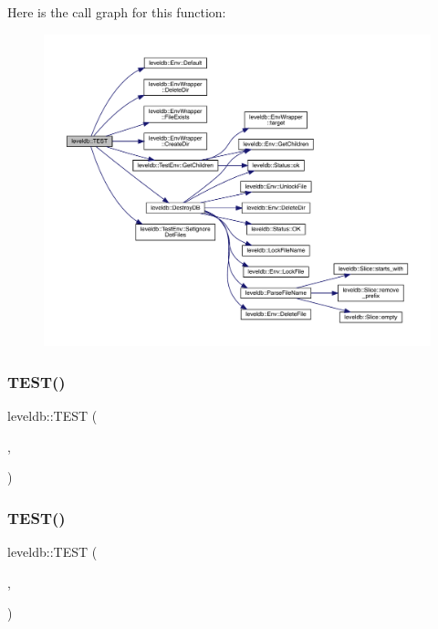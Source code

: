 Here is the call graph for this function\+:
\nopagebreak
\begin{figure}[H]
\begin{center}
\leavevmode
\includegraphics[width=350pt]{namespaceleveldb_a63ad7fa22ccda6c82e41ab295482b8ba_cgraph}
\end{center}
\end{figure}
\mbox{\label{namespaceleveldb_a8e64ab3b4178a875b558d28409764e7f}} 
\subsubsection{\texorpdfstring{TEST()}{TEST()}\hspace{0.1cm}{\footnotesize\ttfamily [91/102]}}
{\footnotesize\ttfamily leveldb\+::\+T\+E\+ST (\begin{DoxyParamCaption}\item[{\mbox{\hyperlink{classleveldb_1_1_d_b_test}{D\+B\+Test}}}]{,  }\item[{Destroy\+Open\+DB}]{ }\end{DoxyParamCaption})}

\mbox{\label{namespaceleveldb_a8470163c7e8b292085a5b60f989dc828}} 
\subsubsection{\texorpdfstring{TEST()}{TEST()}\hspace{0.1cm}{\footnotesize\ttfamily [92/102]}}
{\footnotesize\ttfamily leveldb\+::\+T\+E\+ST (\begin{DoxyParamCaption}\item[{\mbox{\hyperlink{classleveldb_1_1_d_b_test}{D\+B\+Test}}}]{,  }\item[{Locking}]{ }\end{DoxyParamCaption})}

